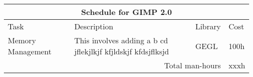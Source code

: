 
\begin{flushleft}		
\begin{tabular}{|l|p{5cm}|l|l|}\hline
\multicolumn{4}{|c|}{\rule[-3mm]{0mm}{8mm} \large \bf Schedule for GIMP 2.0}\\  
\hline
Task & Description & Library & Cost\\ \hline 
Memory Management & This involves adding a b cd jflekjlkjf kfjldskjf kfdsjflksjd & GEGL & 100h\\ 
\hline

\multicolumn{3}{|r|}{Total man-hours} & xxxh\\
\hline
\end{tabular}
\end{flushleft}

	
